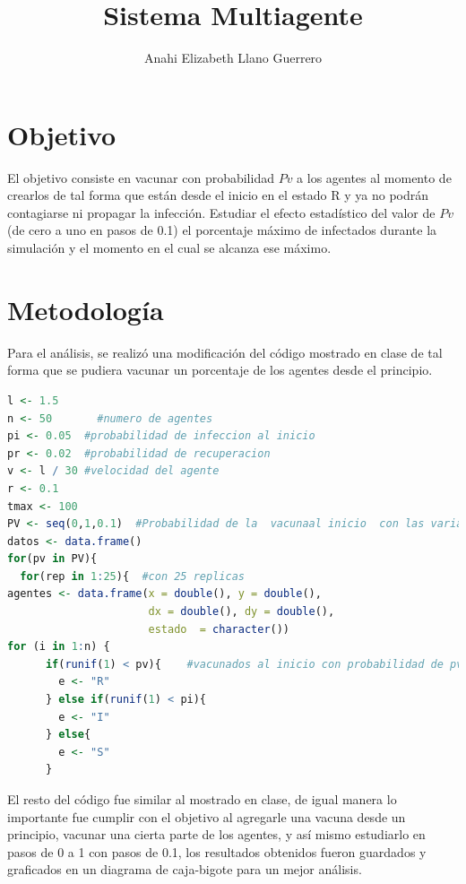 \documentclass{article}
\begin{document}
\title{\textbf{Sistema Multiagente}}
\author{Anahi Elizabeth Llano Guerrero}

\maketitle

\section{Objetivo}\label{obj}

El objetivo \cite{elisa} consiste en vacunar con probabilidad $Pv$ a los agentes al momento de crearlos de tal forma que est\'an desde el inicio en el estado R y ya no podr\'an contagiarse ni propagar la infecci\'on. Estudiar el efecto estad\'istico del valor de $Pv$  (de cero a uno en pasos de 0.1) el porcentaje m\'aximo de infectados durante la simulaci\'on y el momento en el cual se alcanza ese m\'aximo.

\section{Metodolog\'{i}a}\label{met}

Para el an\'alisis, se realiz\'o una modificaci\'on del c\'odigo \citet{elisa} mostrado en clase de tal forma que se pudiera vacunar un porcentaje de los agentes desde el principio.


\begin{lstlisting}[language=R]
l <- 1.5     
n <- 50       #numero de agentes
pi <- 0.05  #probabilidad de infeccion al inicio
pr <- 0.02  #probabilidad de recuperacion
v <- l / 30 #velocidad del agente
r <- 0.1 
tmax <- 100 
PV <- seq(0,1,0.1)  #Probabilidad de la  vacunaal inicio  con las variaciones
datos <- data.frame()
for(pv in PV){   
  for(rep in 1:25){  #con 25 replicas
agentes <- data.frame(x = double(), y = double(),
                      dx = double(), dy = double(),
                      estado  = character())
for (i in 1:n) {                                                       
      if(runif(1) < pv){    #vacunados al inicio con probabilidad de pv
        e <- "R"
      } else if(runif(1) < pi){
        e <- "I"
      } else{
        e <- "S"
      }
\end{lstlisting}
  

El resto del c\'odigo \citep{ana} fue similar al mostrado en clase, de igual manera lo importante fue cumplir con el objetivo al agregarle una vacuna desde un principio, vacunar una cierta parte de los agentes, y as\'i mismo estudiarlo en pasos de 0 a 1 con pasos de 0.1, los resultados obtenidos fueron guardados y graficados en un diagrama de caja-bigote para un mejor an\'alisis.
\end{document}
